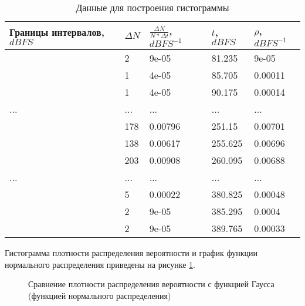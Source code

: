 \documentclass[12pt, a4paper]{article}
\begin{document}
\begin{table}[!h]
\begin{center}
\begin{tabular}{|l|l|l|l|l|}
\hline
Границы интервалов, $dBFS$ & $\Delta N$& $\frac{\Delta N}{N*\Delta t}$, $dBFS^{-1}$ & $t$, $dBFS$ & $\rho$, $dBFS^{-1}$\\
\hline 
[79.0;83.47]& 2 &  9e-05 & 81.235 & 9e-05 \\ 
\hline
[83.47;87.94] & 1 & 4e-05 & 85.705 & 0.00011 \\ 
\hline
[87.94;92.41] & 1 & 4e-05 & 90.175 & 0.00014 \\ 
\hline
... & ... & ... & ... & ...\\
\hline
[248.91;253.39] & 178 & 0.00796 & 251.15 & 0.00701 \\ 
\hline
[253.39;257.86] & 138 & 0.00617 & 255.625 & 0.00696 \\ 
\hline
[257.86;262.33] & 203 & 0.00908 & 260.095 & 0.00688 \\ 
\hline
... & ... & ... & ... & ...\\
\hline
[378.59;383.06] & 5 & 0.00022 & 380.825 & 0.00048 \\ 
\hline
[383.06;387.53] & 2 & 9e-05 & 385.295 & 0.0004 \\ 
\hline
[387.53;392.0] & 2 & 9e-05 & 389.765 & 0.00033 \\ 
\hline
\end{tabular}
\caption{Данные для построения гистограммы}
\end{center}
\label{tab:2}
\end{table}

Гистограмма плотности распределения вероятности и график функции нормального распределения приведены на рисунке \ref{gr:1}.

\begin{figure}[H]
\caption{Сравнение плотности распределения вероятности с функцией Гаусса (функцией нормального распределения)}
\label{gr:1}
\end{figure}
\end{document}
